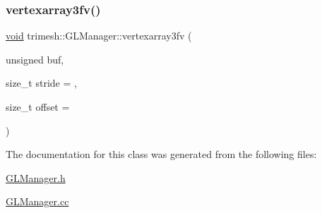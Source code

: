 \subsubsection{\texorpdfstring{vertexarray3fv()}{vertexarray3fv()}\hspace{0.1cm}{\footnotesize\ttfamily [3/3]}}
{\footnotesize\ttfamily \hyperlink{namespacetrimesh_a784ddfd979e1c579bda795a8edfc3f43}{void} trimesh\+::\+G\+L\+Manager\+::vertexarray3fv (\begin{DoxyParamCaption}\item[{unsigned}]{buf,  }\item[{size\+\_\+t}]{stride = {},  }\item[{size\+\_\+t}]{offset = {} }\end{DoxyParamCaption})}



The documentation for this class was generated from the following files\+:\begin{DoxyCompactItemize}
\item 
\hyperlink{GLManager_8h}{G\+L\+Manager.\+h}\item 
\hyperlink{GLManager_8cc}{G\+L\+Manager.\+cc}\end{DoxyCompactItemize}
